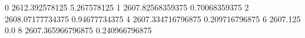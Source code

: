 0 2612.392578125 5.267578125
1 2607.82568359375 0.70068359375
2 2608.07177734375 0.94677734375
4 2607.334716796875 0.209716796875
6 2607.125 0.0
8 2607.365966796875 0.240966796875
